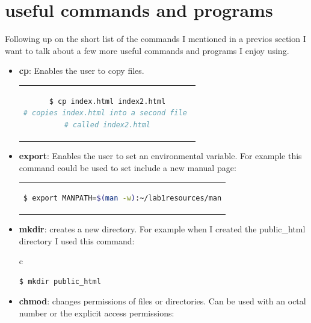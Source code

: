 \documentclass[12pt,a4paper]{article}
\begin{document}
\section{useful commands and programs}
Following up on the short list of the commands I mentioned in a previos section I want to talk about a few more useful commands and programs I enjoy using.
\begin{itemize}
\item \textbf{cp}: Enables the user to copy files. 
\begin{center}
\begin{tabular}{c}
\begin{lstlisting}[language=bash]
$ cp index.html index2.html
# copies index.html into a second file 
# called index2.html
\end{lstlisting}
\end{tabular}
\end{center}
\item \textbf{mv}: Enables the user to move and rename files. 
\begin{center}
\begin{tabular}{c}
\begin{lstlisting}[language=bash]
$ mv index.html index2.html
# renames index.html into index2.html
\end{lstlisting}
\end{tabular}
\end{center}
\item \textbf{export}: Enables the user to set an environmental variable. For example this command could be used to set include a new manual page:

\begin{center}
\begin{tabular}{c}
\begin{lstlisting}[language=bash]
$ export MANPATH=$(man -w):~/lab1resources/man
\end{lstlisting}
\end{tabular}
\end{center}
\item \textbf{mkdir}: creates a new directory. For example when I created the public\_html directory I used this command:

\begin{center}
\begin{tabular}{c}
\begin{lstlisting}[language=bash]
$ mkdir public_html
\end{lstlisting}
\end{tabular}
\end{center}
\item \textbf{chmod}: changes permissions of files or directories. Can be used with an octal number or the explicit access permissions:


\end{itemize}
\end{document}
